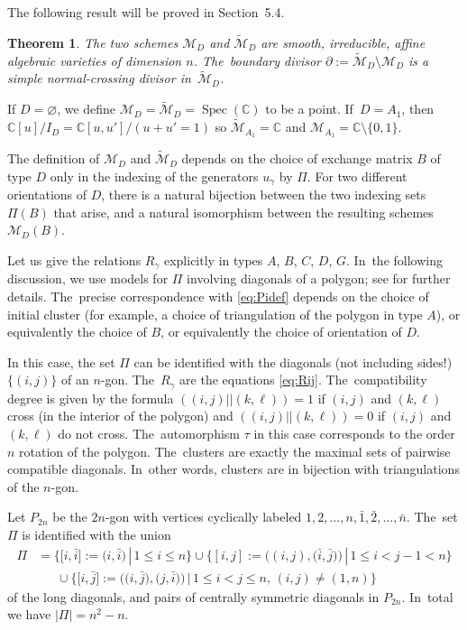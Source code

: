 \documentclass[10pt,a4paper]{amsart}
\def\C{{\mathbb C}}
\def\Spec{\operatorname{Spec}}
\def\M{{\mathcal{M}}}
\def\tM{{\widetilde {\mathcal{M}}}}
\numberwithin{equation}{section}
\newtheorem{Theorem}{Theorem}[section]
\begin{document}
The following result will be proved in Section~5.4.


\begin{Theorem}\label{thm:geom}
The two schemes $\M_D$ and $\tM_D$ are smooth, irreducible, affine algebraic varieties of dimension $n$. The~boundary divisor $\partial:= \tM_D \setminus \M_D$ is a simple normal-crossing divisor in~$\tM_D$.
\end{Theorem}


If $D = \varnothing$, we define $\M_D = \tM_D = \Spec(\C)$ to be a point. If~$D = A_1$, then $\C[u]/I_D = \C[u,u']/(u+u'=1)$ so $\tM_{A_1} = \C$ and $\M_{A_1} = \C \setminus \{0,1\}$.

\begin{Remark}
The definition of $\M_D$ and $\tM_D$ depends on the choice of exchange matrix $B$ of type $D$ only in the indexing of the generators $u_\gamma$ by $\Pi$. For two different orientations of $D$, there is a natural bijection between the two indexing sets $\Pi(B)$ that arise, and a natural isomorphism between the resulting schemes $\M_D(B)$.
\end{Remark}

\medskip{} %
Let us give the relations $R_\gamma$ explicitly in types $A$, $B$, $C$, $D$, $G$. In~the following discussion, we use models for $\Pi$ involving diagonals of a polygon; see \cite{CA2} for further details. The~precise correspondence with \eqref{eq:Pidef} depends on the choice of initial cluster (for example, a choice of triangulation of the polygon in type $A$), or equivalently the choice of $B$, or equivalently the choice of orientation of $D$.

\medskip{} In this case, the set $\Pi$ can be identified with the diagonals (not including sides!) $\{(i,j)\}$ of an $n$-gon. The~$R_\gamma$ are the equations \eqref{eq:Rij}. The~compatibility degree is given by the formula $((i,j) || (k,\ell)) = 1$ if $(i,j)$ and $(k,\ell)$ cross (in the interior of the polygon) and $((i,j) || (k,\ell)) = 0$ if $(i,j)$ and $(k,\ell)$ do not cross. The~automorphism $\tau$ in this case corresponds to the order $n$ rotation of the polygon. The~clusters are exactly the maximal sets of pairwise compatible diagonals. In~other words, clusters are in bijection with triangulations of the $n$-gon.

\medskip{} Let $P_{2n}$ be the $2n$-gon with vertices cyclically labeled $1,2,\dots,n,\bar 1,\bar 2,\dots, \bar n$. The~set $\Pi$ is identified with the union
\begin{align}
\Pi &= \Big\{\big[i,\bar i\big]:= \big(i,\bar i\big) \,|\, 1 \leq i \leq n\Big\}
\cup \Big\{[i, j] := \big((i,j),\big(\bar i, \bar j\big)\big) \,|\, 1 \leq i <j-1 < n\Big\}\nonumber
\\
&{}\phantom{=\ }\cup \Big\{\big[i,\bar j\big] := \big(\big(i,\bar j\big),\big(j, \bar i\big)\big) \,|\, 1 \leq i < j \leq n, \, (i,j) \neq (1,n)\Big\}
\label{eq:PiC}
\end{align}
of the long diagonals, and pairs of centrally symmetric diagonals in $P_{2n}$. In~total we have $|\Pi| = n^2-n$.
\end{document}
